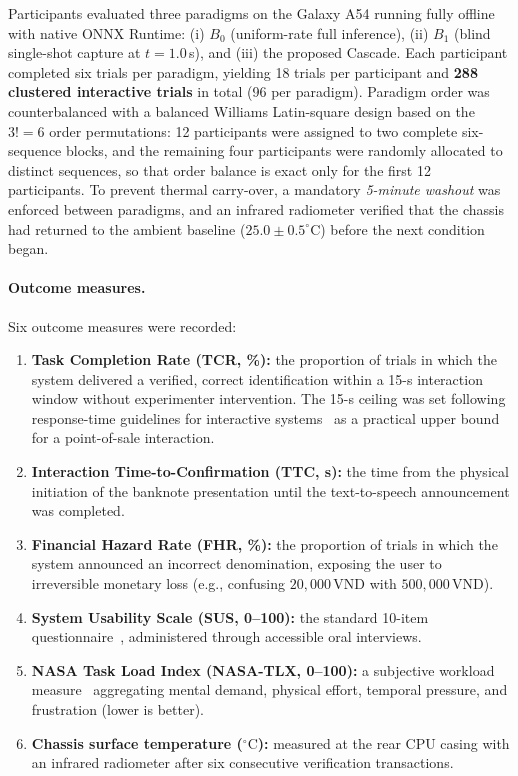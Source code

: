 \documentclass[final,5p,times,twocolumn,authoryear]{elsarticle}
\begin{document}
Participants evaluated three paradigms on the Galaxy A54 running fully offline with native ONNX Runtime: (i) $B_0$ (uniform-rate full inference), (ii) $B_1$ (blind single-shot capture at $t = 1.0$\,s), and (iii) the proposed Cascade. Each participant completed six trials per paradigm, yielding 18 trials per participant and \textbf{288 clustered interactive trials} in total (96 per paradigm). Paradigm order was counterbalanced with a balanced Williams Latin-square design based on the $3! = 6$ order permutations: 12 participants were assigned to two complete six-sequence blocks, and the remaining four participants were randomly allocated to distinct sequences, so that order balance is exact only for the first 12 participants. To prevent thermal carry-over, a mandatory \textit{5-minute washout} was enforced between paradigms, and an infrared radiometer verified that the chassis had returned to the ambient baseline ($25.0 \pm 0.5^\circ\text{C}$) before the next condition began.

\paragraph{Outcome measures.}
Six outcome measures were recorded:
\begin{enumerate}[label=(\roman*)]
    \item \textbf{Task Completion Rate (TCR, \%):} the proportion of trials in which the system delivered a verified, correct identification within a 15-s interaction window without experimenter intervention. The 15-s ceiling was set following response-time guidelines for interactive systems~\cite{Nielsen1993,kamikubo2024} as a practical upper bound for a point-of-sale interaction.
    \item \textbf{Interaction Time-to-Confirmation (TTC, s):} the time from the physical initiation of the banknote presentation until the text-to-speech announcement was completed.
    \item \textbf{Financial Hazard Rate (FHR, \%):} the proportion of trials in which the system announced an incorrect denomination, exposing the user to irreversible monetary loss (e.g., confusing $20{,}000$\,VND with $500{,}000$\,VND).
    \item \textbf{System Usability Scale (SUS, 0--100):} the standard 10-item questionnaire~\cite{Brooke1996,Bangor2008}, administered through accessible oral interviews.
    \item \textbf{NASA Task Load Index (NASA-TLX, 0--100):} a subjective workload measure~\cite{Hart1988} aggregating mental demand, physical effort, temporal pressure, and frustration (lower is better).
    \item \textbf{Chassis surface temperature ($^\circ\text{C}$):} measured at the rear CPU casing with an infrared radiometer after six consecutive verification transactions.
\end{enumerate}
\end{document}
